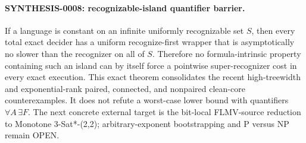 \paragraph{SYNTHESIS-0008: recognizable-island quantifier barrier.}
If a language is constant on an infinite uniformly recognizable set $S$,
then every total exact decider has a uniform recognize-first wrapper that is
asymptotically no slower than the recognizer on all of $S$.  Therefore no
formula-intrinsic property containing such an island can by itself force a
pointwise super-recognizer cost in every exact execution.  This exact theorem
consolidates the recent high-treewidth and exponential-rank paired,
connected, and nonpaired clean-core counterexamples.  It does not refute a
worst-case lower bound with quantifiers $\forall A\,\exists F$.  The next
concrete external target is the bit-local FLMV-source reduction to Monotone
3-Sat*-(2,2); arbitrary-exponent bootstrapping and P versus NP remain OPEN.

